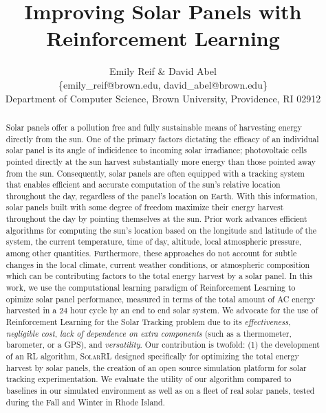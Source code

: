 \documentclass[11pt]{article}
\title{Improving Solar Panels with Reinforcement Learning}
\author{Emily Reif  \& David Abel \\ \{emily\_reif@brown.edu, david\_abel@brown.edu\} \\ Department of Computer Science, Brown University, Providence, RI 02912 }
\date{}
\begin{document}
\maketitle

\begin{abstract}
Solar panels offer a pollution free and fully sustainable means of harvesting energy directly from the sun. One of the primary factors dictating the efficacy of an individual solar panel is its angle of indicidence to incoming solar irradiance; photovoltaic cells pointed directly at the sun harvest substantially more energy than those pointed away from the sun. Consequently, solar panels are often equipped with a tracking system that enables efficient and accurate computation of the sun's relative location throughout the day, regardless of the panel's location on Earth. With this information, solar panels built with some degree of freedom maximize their energy harvest throughout the day by pointing themselves at the sun. Prior work advances efficient algorithms for computing the sun's location based on the longitude and latitude of the system, the current temperature, time of day, altitude, local atmospheric pressure, among other quantities. Furthermore, these approaches do not account for subtle changes in the local climate, current weather conditions, or atmospheric composition which can be contributing factors to the total energy harvest by a solar panel. In this work, we use the computational learning paradigm of Reinforcement Learning to opimize solar panel performance, measured in terms of the total amount of AC energy harvested in a 24 hour cycle by an end to end solar system. We advocate for the use of Reinforcement Learning for the Solar Tracking problem due to its {\it effectiveness}, {\it negligible cost}, {\it lack of dependence on extra components} (such as a thermometer, barometer, or a GPS), and {\it versatility}. Our contribution is twofold: (1) the development of an RL algorithm, \textsc{SolarRL} designed specifically for optimizing the total energy harvest by solar panels, the creation of an open source simulation platform for solar tracking experimentation. We evaluate the utility of our algorithm compared to baselines in our simulated environment as well as on a fleet of real solar panels, tested during the Fall and Winter in Rhode Island.
\end{abstract}

\end{document}
